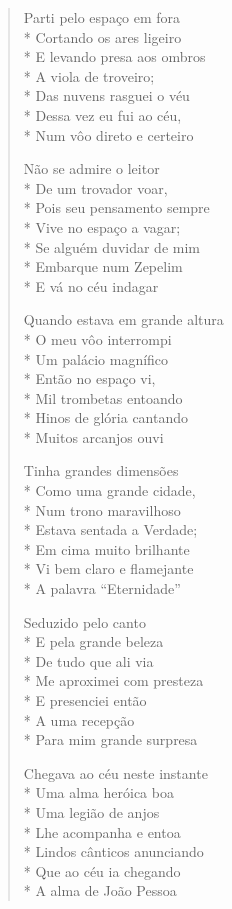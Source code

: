 \begin{verse}

Parti pelo espaço em fora\\*
Cortando os ares ligeiro\\*
E levando presa aos ombros\\*
A viola de troveiro;\\*
Das nuvens rasguei o véu\\*
Dessa vez eu fui ao céu,\\*
Num vôo direto e certeiro

Não se admire o leitor\\*
De um trovador voar,\\*
Pois seu pensamento sempre\\*
Vive no espaço a vagar;\\*
Se alguém duvidar de mim\\*
Embarque num Zepelim\\*
E vá no céu indagar

Quando estava em grande altura\\*
O meu vôo interrompi\\*
Um palácio magnífico\\*
Então no espaço vi,\\*
Mil trombetas entoando\\*
Hinos de glória cantando\\*
Muitos arcanjos ouvi

Tinha grandes dimensões\\*
Como uma grande cidade,\\*
Num trono maravilhoso\\*
Estava sentada a Verdade;\\*
Em cima muito brilhante\\*
Vi bem claro e flamejante\\*
A palavra ``Eternidade''

Seduzido pelo canto\\*
E pela grande beleza\\*
De tudo que ali via\\*
Me aproximei com presteza\\*
E presenciei então\\*
A uma recepção\\*
Para mim grande surpresa

Chegava ao céu neste instante\\*
Uma alma heróica boa\\*
Uma legião de anjos\\*
Lhe acompanha e entoa\\*
Lindos cânticos anunciando\\*
Que ao céu ia chegando\\*
A alma de João Pessoa


\end{verse}
